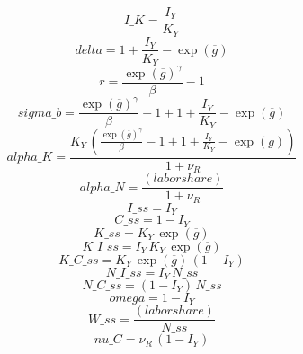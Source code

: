 \begin{dmath*}
I\_K = \frac{{{I_Y}}}{{{K_Y}}}
\end{dmath*}
\begin{dmath*}
delta = 1+\frac{{{I_Y}}}{{{K_Y}}}-\exp\left({{\overline{g}}}\right)
\end{dmath*}
\begin{dmath*}
r = \frac{\exp\left({{\overline{g}}}\right)^{{{\gamma}}}}{{{\beta}}}-1
\end{dmath*}
\begin{dmath*}
sigma\_b = \frac{\exp\left({{\overline{g}}}\right)^{{{\gamma}}}}{{{\beta}}}-1+1+\frac{{{I_Y}}}{{{K_Y}}}-\exp\left({{\overline{g}}}\right)
\end{dmath*}
\begin{dmath*}
alpha\_K = \frac{{{K_Y}}\, \left(\frac{\exp\left({{\overline{g}}}\right)^{{{\gamma}}}}{{{\beta}}}-1+1+\frac{{{I_Y}}}{{{K_Y}}}-\exp\left({{\overline{g}}}\right)\right)}{1+{{\nu_R}}}
\end{dmath*}
\begin{dmath*}
alpha\_N = \frac{{(labor share)}}{1+{{\nu_R}}}
\end{dmath*}
\begin{dmath*}
I\_ss = {{I_Y}}
\end{dmath*}
\begin{dmath*}
C\_ss = 1-{{I_Y}}
\end{dmath*}
\begin{dmath*}
K\_ss = {{K_Y}}\, \exp\left({{\overline{g}}}\right)
\end{dmath*}
\begin{dmath*}
K\_I\_ss = {{I_Y}}\, {{K_Y}}\, \exp\left({{\overline{g}}}\right)
\end{dmath*}
\begin{dmath*}
K\_C\_ss = {{K_Y}}\, \exp\left({{\overline{g}}}\right)\, \left(1-{{I_Y}}\right)
\end{dmath*}
\begin{dmath*}
N\_I\_ss = {{I_Y}}\, {N\_ss}
\end{dmath*}
\begin{dmath*}
N\_C\_ss = \left(1-{{I_Y}}\right)\, {N\_ss}
\end{dmath*}
\begin{dmath*}
omega = 1-{{I_Y}}
\end{dmath*}
\begin{dmath*}
W\_ss = \frac{{(labor share)}}{{N\_ss}}
\end{dmath*}
\begin{dmath*}
nu\_C = {{\nu_R}}\, \left(1-{{I_Y}}\right)
\end{dmath*}
